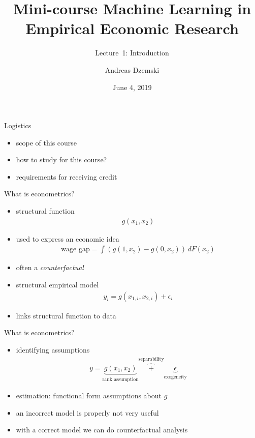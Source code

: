 \documentclass[xcolor=dvipsnames, handout]{beamer}
\author[Dzemski]{Andreas Dzemski\inst{1}}
\institute{\inst{1} University of Gothenburg}
\title{Mini-course Machine Learning in Empirical Economic Research}
\date{June 4, 2019}
\subtitle{Lecture~1: Introduction}
\begin{document}
\maketitle

\begin{frame}{Logistics}
\begin{itemize}
\item scope of this course
\item how to study for this course?
\item requirements for receiving credit
\end{itemize}
\end{frame}

\begin{frame}{What is econometrics?}
\pause
\begin{itemize}
  \item structural function
  \begin{align*}
    g(x_1, x_2)
  \end{align*}
  \item used to express an economic idea
  \begin{align*}
    \text{wage gap} = \int \left(g(1, x_2) - g(0, x_2)\right) \, dF(x_2)
  \end{align*}
  \item often a \emph{counterfactual}
  \pause
  \item structural empirical model
  \begin{align*}
    y_i = g(x_{1,i}, x_{2,i}) + \epsilon_i
  \end{align*}
  \item links structural function to data
\end{itemize}
\end{frame}

\begin{frame}{What is econometrics?}
  \begin{itemize}
    \item identifying assumptions
      \begin{align*}
        y = \underbrace{g(x_1, x_2)}_{\text{rank assumption}} \overbrace{+}^{\text{separability}} \underbrace{\epsilon}_{\text{exogeneity}}
      \end{align*}
    \item estimation: functional form assumptions about $g$
    \item an incorrect model is properly not very useful
    \item with a correct model we can do counterfactual analysis
  \end{itemize}
\end{frame}
\end{document}
